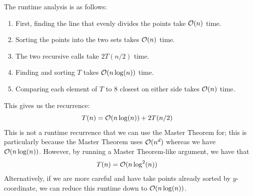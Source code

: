 \documentclass[letterpaper]{article}
\begin{document}
The runtime analysis is as follows: 
\begin{enumerate}[\hspace{0.5cm}(a)]
    \item First, finding the line that evenly divides the points take $\mathcal{O}(n)$ time. 
    \item Sorting the points into the two sets takes $\mathcal{O}(n)$ time. 
    \item The two recursive calls take $2T(n / 2)$ time. 
    \item Finding and sorting $T$ takes $\mathcal{O}(n\log(n))$ time. 
    \item Comparing each element of $T$ to 8 closest on either side takes $\mathcal{O}(n)$ time. 
\end{enumerate}
This gives us the recurrence: 
\[T(n) = \mathcal{O}(n\log(n)) + 2T(n / 2)\]
This is not a runtime recurrence that we can use the Master Theorem for; this is particularly because the Master Theorem uses $\mathcal{O}(n^d)$ whereas we have $\mathcal{O}(n\log(n))$. However, by running a Master Theorem-like argument, we have that 
\[T(n) = \mathcal{O}(n\log^{2}(n))\]
Alternatively, if we are more careful and have  take points already sorted by $y$-coordinate, we can reduce this runtime down to $\mathcal{O}(n\log(n))$. 

 
\end{document}
